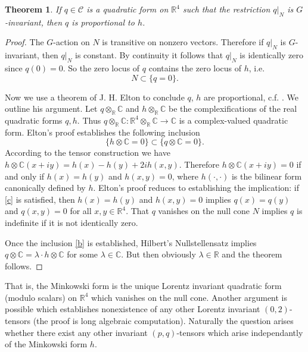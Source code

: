 \documentclass[12pt]{amsart}
\newtheorem*{thm}{Theorem}
\theoremstyle{definition}
\theoremstyle{remark}
\newcommand{\bC}{\mathbb{C}}
\newcommand{\bR}{\mathbb{R}}
\newcommand{\sC}{\mathscr{C}}
\begin{document}
\begin{thm}
If $q\in \sC$ is a quadratic form on $\bR^4$ such that the restriction $q|_N$ is $G$-invariant, then $q$ is proportional to $h$. 
\end{thm} 
\begin{proof}
The $G$-action on $N$ is transitive on nonzero vectors. Therefore if $q|_N$ is $G$-invariant, then $q|_N$ is constant. By continuity it follows that $q|_N$ is identically zero since $q(0)=0$. So the zero locus of $q$ contains the zero locus of $h$, i.e. \begin{equation}\label{c} N\subset \{q=0\}.
\end{equation}

Now we use a theorem of J. H. Elton to conclude $q$, $h$ are proportional, c.f. \cite{elton2010indefinite}. We outline his argument. Let $q\otimes_\bR \bC$ and $h\otimes_\bR \bC$ be the complexifications of the real quadratic forms $q,h$. Thus $q\otimes_\bR \bC: \bR^4 \otimes_\bR \bC \to \bC$ is a complex-valued quadratic form. Elton's proof establishes the following inclusion \begin{equation}\label{b}
\{h\otimes \bC=0\} \subset \{q\otimes \bC=0\}.
\end{equation}
According to the tensor construction we have $h\otimes \bC (x+iy)=h(x)-h(y) + 2i h(x,y)$. Therefore $h\otimes \bC(x+iy)=0$ if and only if $h(x)=h(y)$ and $h(x,y)=0$, where $h(\cdot, \cdot)$ is the bilinear form canonically defined by $h$. Elton's proof reduces to establishing the implication: if \eqref{c} is satisfied, then $h(x)=h(y)$ and $h(x,y)=0$ implies $q(x)=q(y)$ and $q(x,y)=0$ for all $x,y\in \bR^4$. That $q$ vanishes on the null cone $N$ implies $q$  is indefinite if it is not identically zero.

Once the inclusion \eqref{b} is established, Hilbert's Nullstellensatz \cite{eisenbud2013commutative} implies $q\otimes \bC=\lambda \cdot h\otimes \bC$ for some $\lambda \in \bC$. But then obviously $\lambda\in \bR$ and the theorem follows.
\end{proof}

That is, the Minkowski form is the unique Lorentz invariant quadratic form (modulo scalars) on $\bR^4$ which vanishes on the null cone. Another argument is possible \cite{arminjon2018lorentz} which establishes nonexistence of any other Lorentz invariant $(0,2)$-tensors (the proof is long algebraic computation). Naturally the question arises whether there exist any other invariant $(p,q)$-tensors which arise independantly of the Minkowski form $h$. 
\end{document}
